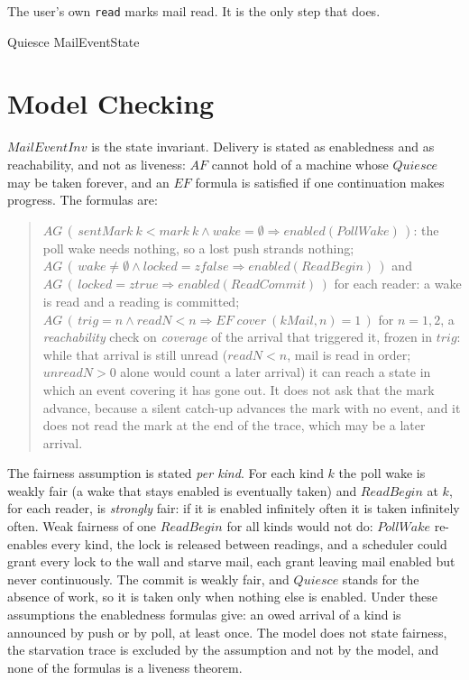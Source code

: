 \documentclass[a4paper,10pt,fleqn]{article}
\begin{document}
The user's own \texttt{read} marks mail read.  It is the only step that does.

\begin{schema}{Quiesce}
  \Xi MailEventState
\end{schema}

\section{Model Checking}

$MailEventInv$ is the state invariant.  Delivery is stated as enabledness and as
reachability, and not as liveness: $AF$ cannot hold of a machine whose $Quiesce$
may be taken forever, and an $EF$ formula is satisfied if one continuation makes
progress.  The formulas are:

\begin{quote}
  $AG\,(\,sentMark~k < mark~k \land wake = \emptyset \Rightarrow
  enabled(PollWake)\,)$: the poll wake needs nothing, so a lost push strands
  nothing; \\
  $AG\,(\,wake \neq \emptyset \land locked = zfalse \Rightarrow
  enabled(ReadBegin)\,)$ and $AG\,(\,locked = ztrue \Rightarrow
  enabled(ReadCommit)\,)$ for each reader: a wake is read and a reading is
  committed; \\
  $AG\,(\,trig = n \land readN < n \Rightarrow EF\;cover~(kMail, n) = 1\,)$ for
  $n = 1, 2$, a \emph{reachability} check on \emph{coverage} of the arrival that
  triggered it, frozen in $trig$: while that arrival is still unread ($readN < n$,
  mail is read in order; $unreadN > 0$ alone would count a later arrival) it can
  reach a state in which an event covering it has gone out.  It does not ask that the mark advance,
  because a silent catch-up advances the mark with no event, and it does not read
  the mark at the end of the trace, which may be a later arrival.
\end{quote}

The fairness assumption is stated \emph{per kind}.  For each kind $k$ the poll wake
is weakly fair (a wake that stays enabled is eventually taken) and $ReadBegin$ at
$k$, for each reader, is \emph{strongly} fair: if it is enabled infinitely often it
is taken infinitely often.  Weak fairness of one $ReadBegin$ for all kinds would not
do: $PollWake$ re-enables every kind, the lock is released between readings, and a
scheduler could grant every lock to the wall and starve mail, each grant leaving
mail enabled but never continuously.  The commit is weakly fair, and $Quiesce$
stands for the absence of work, so it is taken only when nothing else is enabled.
Under these assumptions the enabledness formulas give: an owed arrival of a kind is
announced by push or by poll, at least once.  The model does not state fairness,
the starvation trace is excluded by the assumption and not by the model, and none of
the formulas is a liveness theorem.
\end{document}
